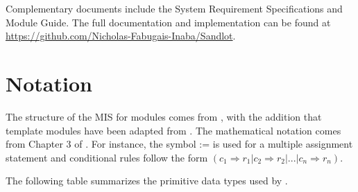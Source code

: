 \documentclass[12pt, titlepage]{article}
\begin{document}
Complementary documents include the System Requirement Specifications
and Module Guide.  The full documentation and implementation can be
found at \url{https://github.com/Nicholas-Fabugais-Inaba/Sandlot}.  

\section{Notation}

The structure of the MIS for modules comes from \citet{HoffmanAndStrooper1995},
with the addition that template modules have been adapted from
\cite{GhezziEtAl2003}.  The mathematical notation comes from Chapter 3 of
\citet{HoffmanAndStrooper1995}.  For instance, the symbol := is used for a
multiple assignment statement and conditional rules follow the form $(c_1
\Rightarrow r_1 | c_2 \Rightarrow r_2 | ... | c_n \Rightarrow r_n )$.

The following table summarizes the primitive data types used by \progname. 
\end{document}
